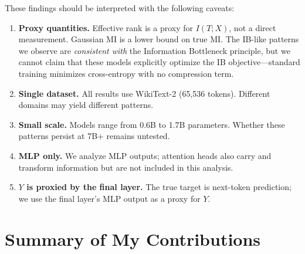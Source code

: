 \documentclass[11pt]{article}
\begin{document}
These findings should be interpreted with the following caveats:
\begin{enumerate}
    \item \textbf{Proxy quantities.} Effective rank is a proxy for $I(T;X)$, not a direct measurement. Gaussian MI is a lower bound on true MI. The IB-like patterns we observe are \emph{consistent with} the Information Bottleneck principle, but we cannot claim that these models explicitly optimize the IB objective---standard training minimizes cross-entropy with no compression term.
    \item \textbf{Single dataset.} All results use WikiText-2 (65,536 tokens). Different domains may yield different patterns.
    \item \textbf{Small scale.} Models range from 0.6B to 1.7B parameters. Whether these patterns persist at 7B+ remains untested.
    \item \textbf{MLP only.} We analyze MLP outputs; attention heads also carry and transform information but are not included in this analysis.
    \item \textbf{$Y$ is proxied by the final layer.} The true target is next-token prediction; we use the final layer's MLP output as a proxy for $Y$.
\end{enumerate}

\section{Summary of My Contributions}
\end{document}
